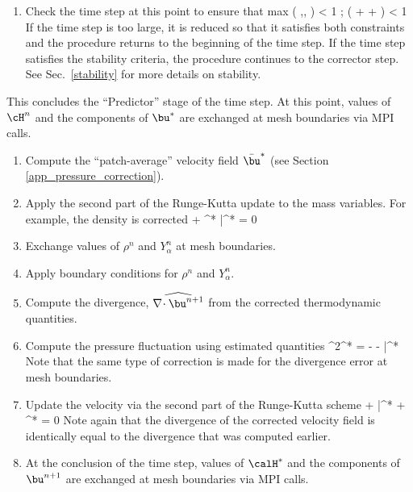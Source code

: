 \begin{enumerate}
\item Check the time step at this point to ensure that
\be \dt \; \hbox{max} \left( ,, \right) < 1 \quad ;  \; \dt \; \nu \; \left( +  +  \right) < 1 \ee
If the time step is too large, it is reduced so that it satisfies both constraints and the procedure returns to the beginning of the time step. If
the time step satisfies the stability criteria, the procedure continues to the corrector step. See Sec.~\ref{stability} for more details on
stability.
\end{enumerate}

\noindent This concludes the ``Predictor'' stage of the time step.  At this point, values of $\cH^n$ and the components of $\bu^*$ are exchanged at
mesh boundaries via MPI calls.

\begin{enumerate}
\item Compute the ``patch-average'' velocity field $\bar{\bu}^*$ (see Section \ref{app_pressure_correction}).

\item Apply the second part of the Runge-Kutta update to the mass variables. For example, the density is corrected
\be {} +  \nabla\!\cdot \rho^* \bar{\bu}^* = 0 \ee

\item Exchange values of $\rho^n$ and $Y_\alpha^n$ at mesh boundaries.

\item Apply boundary conditions for $\rho^n$ and $Y_\alpha^n$.

\item Compute the divergence, $\widehat{\nabla\!\cdot \bu^{n+1}}$ from the corrected thermodynamic quantities.

\item Compute the pressure fluctuation using estimated quantities
\be \label{eqn_corrector_poisson2} \nabla^2\calH^* = - 
   - \nabla\!\cdot \bar{}^*
\ee Note that the same type of correction is made for the divergence error at mesh boundaries.

\item Update the velocity via the second part of the Runge-Kutta scheme
\be {} + \bar{}^* + \nabla \calH^*  = 0 \ee Note again that the
divergence of the corrected velocity field is identically equal to the divergence that was computed earlier.

\item At the conclusion of the time step, values of $\calH^*$ and the components of $\bu^{n+1}$ are exchanged at mesh boundaries via MPI calls.

\end{enumerate}
